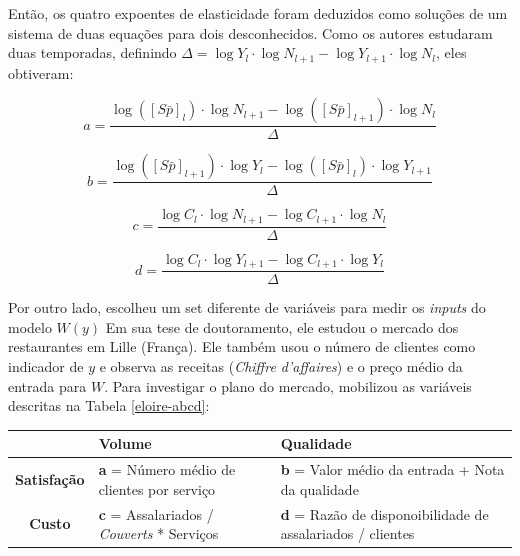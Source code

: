 \documentclass[a4paper, 12pt, openright, oneside, german, french, english, brazil]{abntex2}
\begin{document}
	Então, os quatro expoentes de elasticidade foram deduzidos como soluções de um sistema de duas equações para dois desconhecidos. Como os autores estudaram duas temporadas, definindo $\Delta = \log Y_l \cdot \log N_{l+1} - \log Y_{l+1} \cdot \log N_l$, eles obtiveram:
	
	$$ a = \frac{ \log([S\bar{p}]_l) \cdot \log N_{l+1} - \log([S\bar{p}]_{l+1}) \cdot \log N_{l} }{\Delta} $$
	
	$$ b = \frac{ \log([S\bar{p}]_{l+1}) \cdot \log Y_{l} - \log([S\bar{p}]_{l}) \cdot \log Y_{l+1} }{\Delta} $$
	
	$$ c = \frac{ \log C_l \cdot \log N_{l+1} - \log C_{l+1} \cdot \log N_{l} }{\Delta} $$
	
	\begin{equation}
	\label{parameters}
	d = \frac{ \log C_l \cdot \log Y_{l+1} - \log C_{l+1} \cdot \log Y_{l} }{\Delta}
	\end{equation}
	
	

	
	
	
	Por outro lado,  escolheu um set diferente de variáveis para medir os \textit{inputs} do modelo $W(y)$ Em sua tese de doutoramento, ele estudou o mercado dos restaurantes em Lille (França). Ele também usou o número de clientes como indicador de $y$ e observa as receitas (\textit{Chiffre d'affaires}) e o preço médio da entrada para $W$. Para investigar o plano do mercado,  mobilizou as variáveis descritas na Tabela \ref{eloire-abcd}:
	
	\begin{table}[ht]
		{\begin{tabular}{c | p{5cm} p{5cm}}
				\hline
				& \textbf{Volume}  & \textbf{Qualidade} \\
				\hline
				\textbf{Satisfação}  & \textbf{a} = Número médio de clientes por serviço & \textbf{b} = Valor médio da entrada + Nota da qualidade \\
				\textbf{Custo} & \textbf{c} = Assalariados / \textit{Couverts} * Serviços & \textbf{d} = Razão de disponoibilidade de assalariados / clientes \\
				\hline
			\end{tabular}
		}
		{}
	\end{table}
\end{document}
